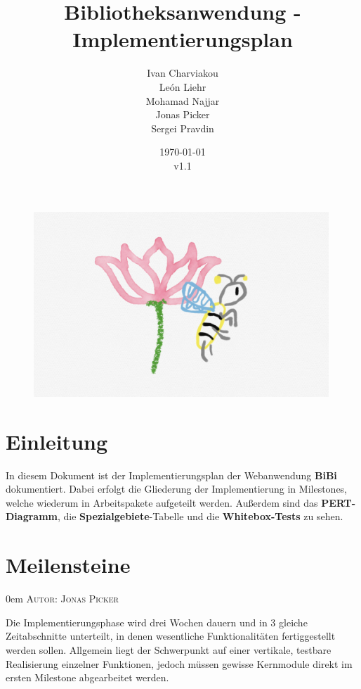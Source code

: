 \documentclass{article}
\title{Bibliotheksanwendung - Implementierungsplan}
\date{\today\\v1.1}
\author{
	Ivan Charviakou\\
	León Liehr\\
	Mohamad Najjar\\
	Jonas Picker\\
	Sergei Pravdin
}
\makeatletter
\newcommand{\sectionauthor}[1]{
	{\parindent 0em \large \scshape Autor: #1 \par \nobreak \vspace*{1em}}
	\@afterheading
}
\makeatother
\begin{document}
\maketitle
\begin{figure}[H]
	\centering
	\includegraphics[width = 30em]{Logo}
\end{figure}
\newpage
\tableofcontents
\newpage


\section{Einleitung}

In diesem Dokument ist der Implementierungsplan der Webanwendung \textbf{BiBi} dokumentiert. Dabei  erfolgt die Gliederung der Implementierung in Milestones, welche wiederum in Arbeitspakete aufgeteilt werden. Außerdem sind das \textbf{PERT-Diagramm},   die \textbf{Spezialgebiete}-Tabelle und die \textbf{Whitebox-Tests} zu sehen.


\section{Meilensteine}
\sectionauthor{Jonas Picker}
Die Implementierungsphase wird drei Wochen dauern und in 3 gleiche Zeitabschnitte unterteilt, in denen wesentliche Funktionalitäten fertiggestellt werden sollen. Allgemein liegt der Schwerpunkt auf einer vertikale, testbare Realisierung einzelner Funktionen, jedoch müssen gewisse Kernmodule direkt im ersten Milestone abgearbeitet werden.
\end{document}
